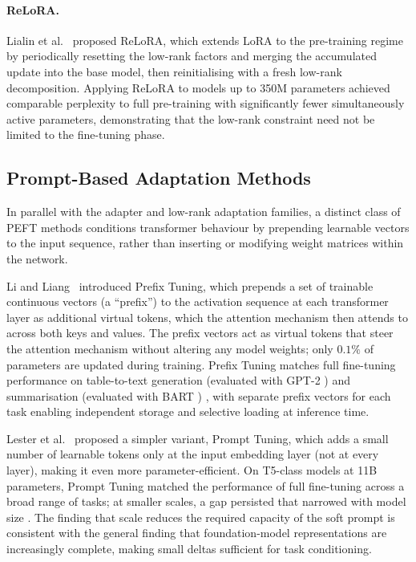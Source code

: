 \paragraph{ReLoRA.}
Lialin et al.~\cite{LialinReLoRA2023} proposed ReLoRA, which extends LoRA to the pre-training regime
by periodically resetting the low-rank factors and merging the accumulated update into the
base model, then reinitialising with a fresh low-rank decomposition. Applying ReLoRA to
models up to 350M parameters achieved comparable perplexity to full pre-training with
significantly fewer simultaneously active parameters, demonstrating that the low-rank
constraint need not be limited to the fine-tuning phase.

\subsection{Prompt-Based Adaptation Methods}
\label{sec:peft:prompt}

In parallel with the adapter and low-rank adaptation families, a distinct class of PEFT
methods conditions transformer behaviour by prepending learnable vectors to the input
sequence, rather than inserting or modifying weight matrices within the network.

Li and Liang~\cite{LiLiang2021} introduced Prefix Tuning, which prepends a set of trainable
continuous vectors (a ``prefix'') to the activation sequence at each transformer
layer as additional virtual tokens, which the attention mechanism then attends to across
both keys and values. The prefix vectors act as virtual tokens that steer the attention
mechanism without
altering any model weights; only $0.1\%$ of parameters are updated during training.
Prefix Tuning matches full fine-tuning performance on
table-to-text generation (evaluated with GPT-2 \cite{RadfordGPT22019}) and summarisation (evaluated with BART \cite{LewisBART2020})
\cite{LiLiang2021}, with separate prefix vectors for each task enabling independent
storage and selective loading at inference time.

Lester et al.~\cite{Lester2021} proposed a simpler variant, Prompt Tuning, which adds a small number
of learnable tokens only at the input embedding layer (not at every layer), making it
even more parameter-efficient. On T5-class models \cite{RaffelT52020} at 11B parameters, Prompt Tuning
matched the performance of full fine-tuning across a broad range of tasks; at smaller
scales, a gap persisted that narrowed with model size \cite{Lester2021}. The finding
that scale reduces the required capacity of the soft prompt is consistent with the general
finding that foundation-model representations are increasingly complete, making small
deltas sufficient for task conditioning.

